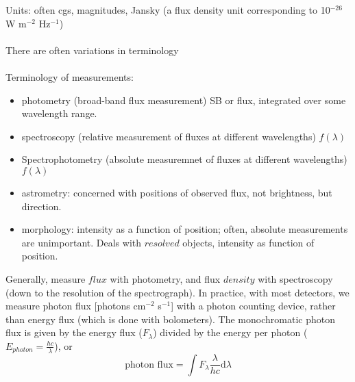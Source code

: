 \documentclass[12pt]{article}
\begin{document}
\noindent Units: often cgs, magnitudes, Jansky (a flux density unit
corresponding to 10$^{-26}$ W m$^{-2}$ Hz$^{-1}$)\\\\
\noindent There are often variations in terminology\\\\
\noindent Terminology of measurements:
\begin{itemize}
    \item photometry (broad-band flux measurement) SB or flux, integrated
        over some wavelength range.
    \item spectroscopy (relative measurement of fluxes at different wavelengths)
        $f(\lambda)$
    \item Spectrophotometry (absolute measuremnet of fluxes at different wavelengths)
        $f(\lambda)$
    \item astrometry: concerned with positions of observed flux, not brightness,
        but direction.
    \item morphology: intensity as a function of position;
        often, absolute measurements are unimportant. Deals with $resolved$
        objects, intensity as function of position.
\end{itemize}
Generally, measure $flux$ with photometry, and flux $density$ with spectroscopy
(down to the resolution of the spectrograph). In practice, with most detectors,
we measure photon flux [photons cm$^{-2}$ s$^{-1}$] with a photon counting device,
rather than energy flux (which is done with bolometers).
The monochromatic photon flux is given by the energy flux ($F_{\lambda}$)
divided by the energy per photon ($E_{photon} = \frac{hc}{\lambda}$),
or
\begin{equation*}
    \textrm{photon\ flux} = \int F_{\lambda} \frac{\lambda}{hc} \textrm{d} \lambda
\end{equation*}
\end{document}
